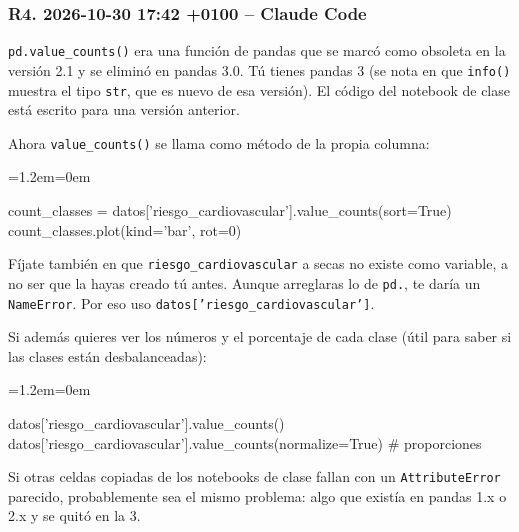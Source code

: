 \documentclass[11pt,a4paper]{article}
\newenvironment{codigo}
  {\par\smallskip\begin{list}{}{\leftmargin=1.2em\rightmargin=0em}\item\relax\ttfamily\scriptsize\raggedright}
  {\end{list}\smallskip}
\begin{document}
\subsubsection*{R4. 2026-10-30 17:42 +0100 -- Claude Code}
{\small
\texttt{pd.value\_\allowbreak{}counts()} era una función de pandas que se marcó como obsoleta en la versión 2.1 y se eliminó en pandas 3.0. Tú tienes pandas 3 (se nota en que \texttt{info()} muestra el tipo \texttt{str}, que es nuevo de esa versión). El código del notebook de clase está escrito para una versión anterior.

Ahora \texttt{value\_\allowbreak{}counts()} se llama como método de la propia columna:

\begin{codigo}
count\_\allowbreak{}classes = datos['riesgo\_\allowbreak{}cardiovascular'].value\_\allowbreak{}counts(sort=True) \\{}
count\_\allowbreak{}classes.plot(kind='bar', rot=0)
\end{codigo}
Fíjate también en que \texttt{riesgo\_\allowbreak{}cardiovascular} a secas no existe como variable, a no ser que la hayas creado tú antes. Aunque arreglaras lo de \texttt{pd.}, te daría un \texttt{NameError}. Por eso uso \texttt{datos['riesgo\_\allowbreak{}cardiovascular']}.

Si además quieres ver los números y el porcentaje de cada clase (útil para saber si las clases están desbalanceadas):

\begin{codigo}
datos['riesgo\_\allowbreak{}cardiovascular'].value\_\allowbreak{}counts() \\{}
datos['riesgo\_\allowbreak{}cardiovascular'].value\_\allowbreak{}counts(normalize=True)  \# proporciones
\end{codigo}
Si otras celdas copiadas de los notebooks de clase fallan con un \texttt{AttributeError} parecido, probablemente sea el mismo problema: algo que existía en pandas 1.x o 2.x y se quitó en la 3.

}
\end{document}
